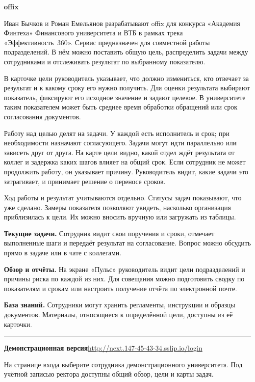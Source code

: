 \documentclass[12pt,a4paper]{article}
\newcommand{\topic}[1]{\par\vspace{4pt}{\large\bfseries #1}\par\nopagebreak}
\begin{document}
{\LARGE\bfseries offix}\par

\vspace{2pt}
Иван Бычков и Роман Емельянов разрабатывают offix для конкурса «Академия Финтеха» Финансового университета и ВТБ в рамках трека «Эффективность~360». Сервис предназначен для совместной работы подразделений. В нём можно поставить общую цель, распределить задачи между сотрудниками и отслеживать результат по выбранному показателю.

\topic{Цели и задачи}
В карточке цели руководитель указывает, что должно измениться, кто отвечает за результат и к какому сроку его нужно получить. Для оценки результата выбирают показатель, фиксируют его исходное значение и задают целевое. В университете таким показателем может быть среднее время обработки обращений или срок согласования документов.

Работу над целью делят на задачи. У каждой есть исполнитель и срок; при необходимости назначают согласующего. Задачи могут идти параллельно или зависеть друг от друга. На карте цели видно, какой отдел ждёт результата от коллег и задержка каких шагов влияет на общий срок. Если сотрудник не может продолжить работу, он указывает причину. Руководитель видит, какие задачи это затрагивает, и принимает решение о переносе сроков.

Ход работы и результат учитываются отдельно. Статусы задач показывают, что уже сделано. Замеры показателя позволяют увидеть, насколько организация приблизилась к цели. Их можно вносить вручную или загружать из таблицы.

\topic{Работа сотрудников и руководителей}
\textbf{Текущие задачи.} Сотрудник видит свои поручения и сроки, отмечает выполненные шаги и передаёт результат на согласование. Вопрос можно обсудить прямо в задаче или в чате с коллегами.

\textbf{Обзор и отчёты.} На экране «Пульс» руководитель видит цели подразделений и причины риска по каждой из них. Для совещания можно подготовить сводку по показателям и срокам или настроить получение отчёта по электронной почте.

\textbf{База знаний.} Сотрудники могут хранить регламенты, инструкции и образцы документов. Материалы, относящиеся к определённой цели, доступны из её карточки.

\vspace{7pt}\hrule\vspace{6pt}
\textbf{Демонстрационная версия}\quad\url{http://next.147-45-43-34.sslip.io/login}\par
На странице входа выберите сотрудника демонстрационного университета. Под учётной записью ректора доступны общий обзор, цели и карты задач.
\end{document}
